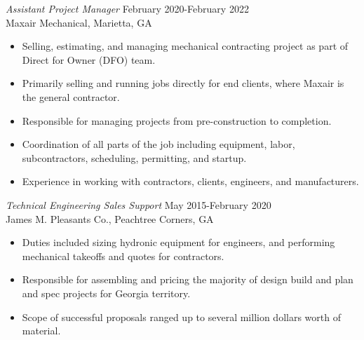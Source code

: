 \documentclass[margin]{res}
\begin{document}
\begin{resume}
    {\sl Assistant Project Manager} \hfill February 2020-February 2022 \\
 	    Maxair Mechanical, Marietta, GA
        \begin{itemize}  \itemsep -2pt %
            \item Selling, estimating, and managing mechanical contracting project as part of Direct for Owner (DFO) team.
            \item Primarily selling and running jobs directly for end clients, where Maxair is the general contractor.
            \item Responsible for managing projects from pre-construction to completion.
            \item Coordination of all parts of the job including equipment, labor, subcontractors, scheduling, permitting, and startup.
            \item Experience in working with contractors, clients, engineers, and manufacturers.
            \end{itemize}

    {\sl Technical Engineering Sales Support} \hfill May 2015-February 2020 \\
        James M. Pleasants Co., Peachtree Corners, GA
        \begin{itemize}  \itemsep -2pt %
            \item Duties included sizing hydronic equipment for engineers, and performing mechanical takeoffs and quotes for contractors.
            \item Responsible for assembling and pricing the majority of design build and plan and spec projects for Georgia territory.
            \item Scope of successful proposals ranged up to several million dollars worth of material.
            \end{itemize}
 


\end{resume}
\end{document}
